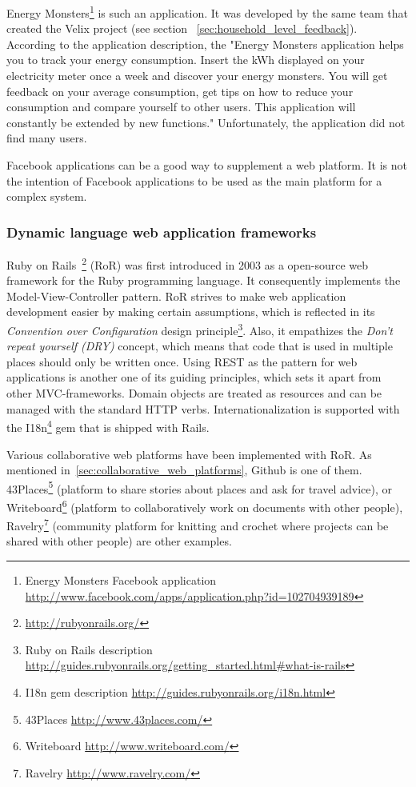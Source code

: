 Energy Monsters\footnote{Energy Monsters Facebook application \url{http://www.facebook.com/apps/application.php?id=102704939189}} is such an application. It was developed by the same team that created the Velix project (see section ~\ref{sec:household_level_feedback}). According to the application description, the "Energy Monsters application helps you to track your energy consumption. Insert the kWh displayed on your electricity meter once a week and discover your energy monsters. You will get feedback on your average consumption, get tips on how to reduce your consumption and compare yourself to other users. This application will constantly be extended by new functions." Unfortunately, the application did not find many users. 

Facebook applications can be a good way to supplement a web platform. It is not the intention of Facebook applications to be used as the main platform for a complex system.

\subsubsection{Dynamic language web application frameworks}

Ruby on Rails~\footnote{\url{http://rubyonrails.org/}} (RoR) was first introduced in 2003 as a open-source web framework for the Ruby programming language. It consequently implements the Model-View-Controller pattern. 
RoR strives to make web application development easier by making certain assumptions, which is reflected in its \textit{Convention over Configuration} design principle\footnote{Ruby on Rails description \url{http://guides.rubyonrails.org/getting_started.html#what-is-rails}}. Also, it empathizes the \textit{Don't repeat yourself (DRY)} concept, which means that code that is used in multiple places should only be written once. 
Using REST as the pattern for web applications is another one of its guiding principles, which sets it apart from other MVC-frameworks. Domain objects are treated as resources and can be managed with the standard HTTP verbs. Internationalization is supported with the I18n\footnote{I18n gem description \url{http://guides.rubyonrails.org/i18n.html}} gem that is shipped with Rails.

Various collaborative web platforms have been implemented with RoR. As mentioned in~\ref{sec:collaborative_web_platforms}, Github is one of them. 43Places\footnote{43Places \url{http://www.43places.com/}} (platform to share stories about places and ask for travel advice), or Writeboard\footnote{Writeboard \url{http://www.writeboard.com/}} (platform to collaboratively work on documents with other people), Ravelry\footnote{Ravelry \url{http://www.ravelry.com/}} (community platform for knitting and crochet where projects can be shared with other people) are other examples.

